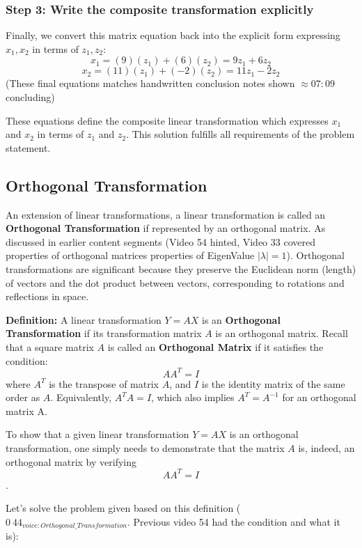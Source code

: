 \documentclass{article}
\begin{document}
\subsubsection*{Step 3: Write the composite transformation explicitly}

Finally, we convert this matrix equation back into the explicit form expressing $x_1, x_2$ in terms of $z_1, z_2$:
\[ x_1 = (9)(z_1) + (6)(z_2) = 9z_1 + 6z_2 \]
\[ x_2 = (11)(z_1) + (-2)(z_2) = 11z_1 - 2z_2 \]
(These final equations matches handwritten conclusion notes shown $\approx 07:09 $ concluding)

These equations define the composite linear transformation which expresses $x_1$ and $x_2$ in terms of $z_1$ and $z_2$. This solution fulfills all requirements of the problem statement. %


\subsection{Orthogonal Transformation} %

An extension of linear transformations, a linear transformation is called an \textbf{Orthogonal Transformation} if represented by an orthogonal matrix. As discussed in earlier content segments (Video 54 hinted, Video 33 covered properties of orthogonal matrices properties of EigenValue $|\lambda|=1$). Orthogonal transformations are significant because they preserve the Euclidean norm (length) of vectors and the dot product between vectors, corresponding to rotations and reflections in space.

\textbf{Definition:}
A linear transformation $Y = AX$ is an \textbf{Orthogonal Transformation} if its transformation matrix $A$ is an orthogonal matrix.
Recall that a square matrix $A$ is called an \textbf{Orthogonal Matrix} if it satisfies the condition:
\[ A A^T = I \]
where $A^T$ is the transpose of matrix $A$, and $I$ is the identity matrix of the same order as $A$. Equivalently, $A^T A = I$, which also implies $A^T = A^{-1}$ for an orthogonal matrix A.

To show that a given linear transformation $Y = AX$ is an orthogonal transformation, one simply needs to demonstrate that the matrix $A$ is, indeed, an orthogonal matrix by verifying $$A A^T = I$$.

Let's solve the problem given based on this definition ($0\ 44_{voice: Orthogonal\_Transformation}$. Previous video 54 had the condition and what it is):
\end{document}
